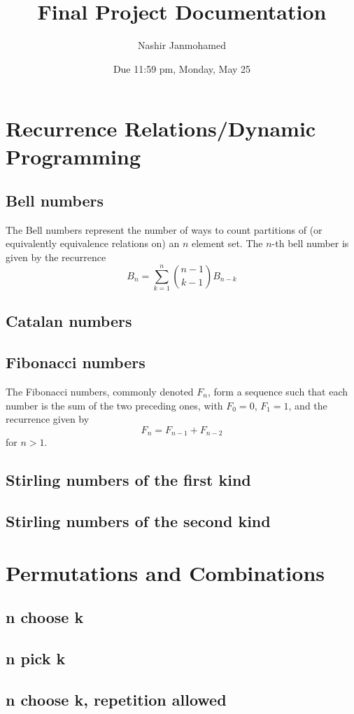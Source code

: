 \documentclass{article}
\title{Final Project Documentation}
\author{Nashir Janmohamed}
\date{Due 11:59 pm, Monday, May 25}
\begin{document}
\maketitle


\section{Recurrence Relations/Dynamic Programming}
\subsection{Bell numbers}
The Bell numbers represent the number of ways to count partitions of (or equivalently equivalence relations on) an $n$ element set. The $n$-th bell number is given by the recurrence
\[B_n = \sum_{k=1}^{n} {n-1 \choose k-1} B_{n-k}\]
\subsection{Catalan numbers}
\subsection{Fibonacci numbers}
The Fibonacci numbers, commonly denoted $F_n$, form a sequence such that each number is the sum of the two preceding ones, with $F_0 = 0$, $F_1 = 1$, and the recurrence given by
\[F_n = F_{n-1}+F_{n-2}\]
for $n > 1$.
\subsection{Stirling numbers of the first kind}
\subsection{Stirling numbers of the second kind}

\section{Permutations and Combinations}
\subsection{n choose k}
\subsection{n pick k}
\subsection{n choose k, repetition allowed}
\end{document}
